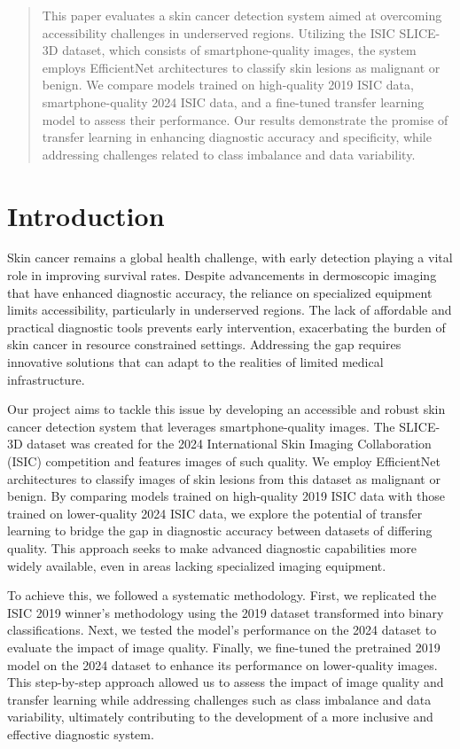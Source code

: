 \documentclass{article}
\begin{document}
\begin{abstract}
    This paper evaluates a skin cancer detection system aimed at overcoming accessibility challenges in underserved
    regions. Utilizing the ISIC SLICE-3D dataset, which consists of smartphone-quality images, the system employs
    EfficientNet architectures to classify skin lesions as malignant or benign. We compare models trained on high-quality
    2019 ISIC data, smartphone-quality 2024 ISIC data, and a fine-tuned transfer learning model to assess their
    performance. Our results demonstrate the promise of transfer learning in enhancing diagnostic accuracy and
    specificity, while addressing challenges related to class imbalance and data variability.
\end{abstract}

\section{Introduction}
\label{introduction}

Skin cancer remains a global health challenge, with early detection playing a vital role in improving survival rates. Despite advancements in dermoscopic imaging that have enhanced diagnostic accuracy, the reliance on specialized equipment limits accessibility, particularly in underserved regions. The lack of affordable and practical diagnostic tools prevents early intervention, exacerbating the burden of skin cancer in resource constrained settings. Addressing the gap requires innovative solutions that can adapt to the realities of limited medical infrastructure.

Our project aims to tackle this issue by developing an accessible and robust skin cancer detection system that leverages smartphone-quality images. The SLICE-3D dataset was created for the 2024 International Skin Imaging Collaboration (ISIC) competition and features images of such quality. We employ EfficientNet architectures to classify images of skin lesions from this dataset as malignant or benign. By comparing models trained on high-quality 2019 ISIC data with those trained on lower-quality 2024 ISIC data, we explore the potential of transfer learning to bridge the gap in diagnostic accuracy between datasets of differing quality. This approach seeks to make advanced diagnostic capabilities more widely available, even in areas lacking specialized imaging equipment.

To achieve this, we followed a systematic methodology. First, we replicated the ISIC 2019 winner's methodology using the 2019 dataset transformed into binary classifications. Next, we tested the model’s performance on the 2024 dataset to evaluate the impact of image quality. Finally, we fine-tuned the pretrained 2019 model on the 2024 dataset to enhance its performance on lower-quality images. This step-by-step approach allowed us to assess the impact of image quality and transfer learning while addressing challenges such as class imbalance and data variability, ultimately contributing to the development of a more inclusive and effective diagnostic system.
\end{document}
